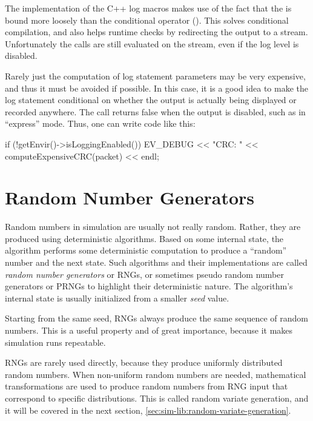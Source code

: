 The implementation of the C++ log macros makes use of the fact that the
 is bound more loosely than the conditional operator
(). This solves conditional compilation, and also helps runtime
checks by redirecting the output to a  stream. Unfortunately the
 calls are still evaluated on the  stream, even if
the log level is disabled.

Rarely just the computation of log statement parameters may be very expensive,
and thus it must be avoided if possible. In this case, it is a good idea to
make the log statement conditional on whether the output is actually being
displayed or recorded anywhere. The  call
returns false when the output is disabled, such as in ``express'' mode. Thus,
one can write code like this:

\begin{cpp}
if (!getEnvir()->isLoggingEnabled())
    EV_DEBUG << "CRC: " << computeExpensiveCRC(packet) << endl;
\end{cpp}




\section{Random Number Generators}
\label{sec:sim-lib:random-number-generators}

Random numbers in simulation are usually not really random. Rather, they
are produced using deterministic algorithms. Based on some internal state,
the algorithm performs some deterministic computation to produce a
``random'' number and the next state. Such algorithms and their
implementations are called \textit{random number generators} or RNGs, or
sometimes pseudo random number generators or PRNGs to highlight their
deterministic nature. The algorithm's internal state is usually initialized
from a smaller \textit{seed} value.

Starting from the same seed, RNGs always produce the same sequence of
random numbers. This is a useful property and of great importance, because
it makes simulation runs repeatable.

RNGs are rarely used directly, because they produce uniformly distributed
random numbers. When non-uniform random numbers are needed, mathematical
transformations are used to produce random numbers from RNG input that
correspond to specific distributions. This is called random variate
generation, and it will be covered in the next section,
\ref{sec:sim-lib:random-variate-generation}.

